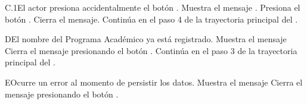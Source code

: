 \begin{UCtrayectoriaA}{C.1}{El actor presiona accidentalmente el botón .}
    \UCpaso Muestra el mensaje .
    \UCpaso[\UCactor] Presiona el botón .
    \UCpaso Cierra el mensaje.
    \UCpaso Continúa en el paso 4 de la trayectoria principal del .
\end{UCtrayectoriaA}


\begin{UCtrayectoriaA}{D}{El nombre del Programa Académico ya está registrado.}
    \UCpaso Muestra el mensaje 
    \UCpaso[\UCactor] Cierra el mensaje presionando el botón .
    \UCpaso Continúa en el paso 3 de la trayectoria principal del .
\end{UCtrayectoriaA}

\begin{UCtrayectoriaA}{E}{Ocurre un error al momento de persistir los datos.}
    \UCpaso Muestra el mensaje 
    \UCpaso[\UCactor] Cierra el mensaje presionando el botón .
\end{UCtrayectoriaA}
